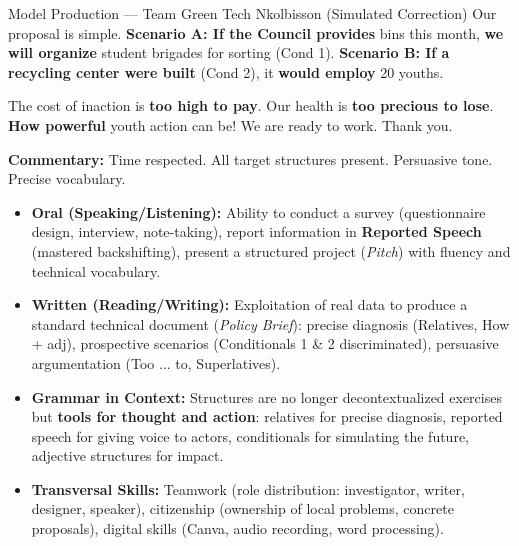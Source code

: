 \documentclass[11pt]{article}
\newcommand{\cle}[1]{{\popxbold\color{popdark}#1}}
\newcounter{popsec}
\newcounter{popsub}
\newcommand{\courssub}[1]{%
  \stepcounter{popsub}%
  \par\vspace{9pt}\noindent{\popxbold\fontsize{11.5}{13}\selectfont\color{popink}{\color{poporange}\thepopsec.\thepopsub}\hspace{6pt}#1}\par\nopagebreak\vspace{4pt}
}
\begin{document}
\begin{exoresolu}{Model Production — Team \og Green Tech Nkolbisson \fg{} (Simulated Correction)}
Our proposal is simple. \textbf{Scenario A: If the Council provides} bins this month, \textbf{we will organize} student brigades for sorting (Cond 1). \textbf{Scenario B: If a recycling center were built} (Cond 2), it \textbf{would employ} 20 youths. 

The cost of inaction is \textbf{too high to pay}. Our health is \textbf{too precious to lose}. \textbf{How powerful} youth action can be! We are ready to work. Thank you. \fg{}
\par \textbf{Commentary:} Time respected. All target structures present. Persuasive tone. Precise vocabulary.
\end{exoresolu}

\courssub{Activity Review}

\begin{aretenir}
\begin{itemize}
\item \textbf{Oral (Speaking/Listening):} Ability to conduct a survey (questionnaire design, interview, note-taking), report information in \textbf{Reported Speech} (mastered backshifting), present a structured project (\emph{Pitch}) with fluency and technical vocabulary.
\item \textbf{Written (Reading/Writing):} Exploitation of real data to produce a standard technical document (\emph{Policy Brief}): precise diagnosis (Relatives, \cle{How + adj}), prospective scenarios (Conditionals 1 \& 2 discriminated), persuasive argumentation (\cle{Too ... to}, Superlatives).
\item \textbf{Grammar in Context:} Structures are no longer decontextualized exercises but \textbf{tools for thought and action}: relatives for precise diagnosis, reported speech for giving voice to actors, conditionals for simulating the future, adjective structures for impact.
\item \textbf{Transversal Skills:} Teamwork (role distribution: investigator, writer, designer, speaker), citizenship (ownership of local problems, concrete proposals), digital skills (Canva, audio recording, word processing).
\end{itemize}
\end{aretenir}
\end{document}
